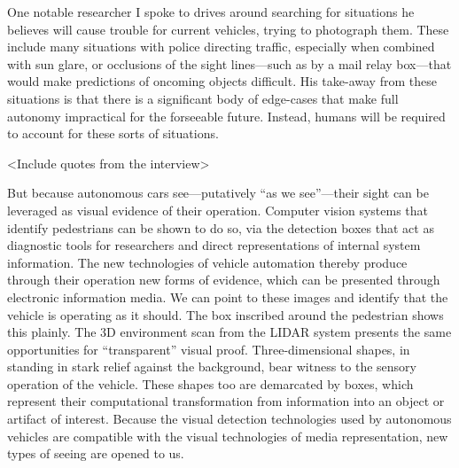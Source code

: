 One notable researcher I spoke to drives around searching
for situations he believes will cause trouble for current vehicles,
trying to photograph them. These include many situations with police
directing traffic, especially when combined with sun glare, or
occlusions of the sight lines---such as by a mail relay box---that
would make predictions of oncoming 
objects difficult. His take-away from these situations is that there
is a significant body of edge-cases that make full autonomy
impractical for the forseeable future. Instead, humans will be
required to account for these sorts of situations. 

<Include quotes from the interview>

But because autonomous cars see---putatively “as we see”---their sight can
be leveraged as visual evidence of their operation. Computer vision systems that identify
pedestrians can be shown to do so, via the detection boxes that act as
diagnostic tools for researchers and direct representations of
internal system information. The new technologies of vehicle
automation thereby produce through 
their operation new forms of evidence, which can be presented through
electronic information media. We can point to these images and identify
that the vehicle is operating as it should. The box inscribed around
the pedestrian shows this plainly. The 3D environment scan from the
LIDAR system presents the same opportunities for “transparent” visual
proof. Three-dimensional shapes, in standing in stark relief against
the background, bear witness to the sensory operation of the vehicle.
These shapes too are demarcated by boxes, which represent their
computational transformation from information into an object or
artifact of interest. Because the visual detection technologies used
by autonomous vehicles are compatible with the visual technologies of
media representation, new types of seeing are opened to us.

